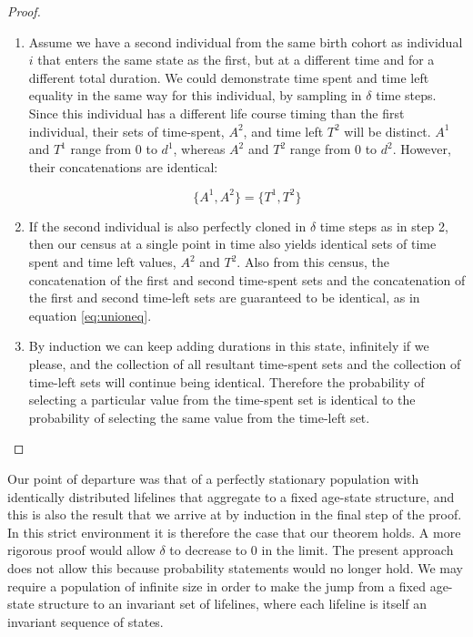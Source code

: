\documentclass[12pt,oneside,a4paper]{article}
\theoremstyle{definition}
\begin{document}
\begin{proof}
\begin{enumerate}
\FloatBarrier
\item{} Assume we have a second individual from the same birth cohort as
individual $i$ that enters the same state as the first, but at a different time
and for a different total duration. We could demonstrate time spent and time left equality in the same
way for this individual, by sampling in $\delta$ time steps. Since
this individual has a different life course timing than the first individual, their
sets of time-spent, $A^2$, and time left $T^2$ will be distinct. $A^1$ and $T^1$ range from 0 to $d^1$, whereas $A^2$ and $T^2$
range from 0 to $d^2$. However, their concatenations are identical:

\begin{equation}
\label{eq:unioneq}
\{A^1 , A^2\} = \{T^1 , T^2\}
\end{equation}

\item{} If the second individual is also perfectly cloned in $\delta$ time
steps as in step 2, then our census at a single point in time also
yields identical sets of time spent and time left values, $A^2$ and $T^2$. Also
from this census, the concatenation of the first and second time-spent sets and the concatenation of the first and second time-left sets
are guaranteed to be identical, as in equation \eqref{eq:unioneq}. 

\item{} By induction we can keep adding durations in this state, infinitely if we
please, and the collection of all resultant time-spent sets and the collection
of time-left sets will continue being identical. Therefore the probability of selecting a particular value from the time-spent set is identical
to the probability of selecting the same value from the time-left set. 
\end{enumerate}
\end{proof}

Our point of departure was that of a perfectly stationary population with
identically distributed lifelines that aggregate to a fixed age-state structure,
and this is also the result that we arrive at by induction in the final step of
the proof. In this strict environment it is therefore the case that our theorem
holds. A more rigorous proof would allow $\delta$ to decrease to 0 in the
limit. The present approach does not allow this because probability statements
would no longer hold. We may require a population of infinite size in order to
make the jump from a fixed age-state structure to an invariant set of lifelines,
where each lifeline is itself an invariant sequence of states. 
\end{document}
